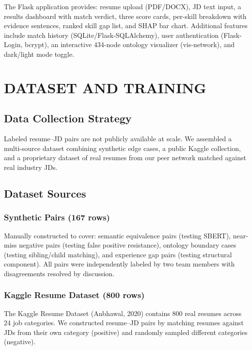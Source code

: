 \documentclass[12pt,a4paper]{report}
\begin{document}
The Flask application provides: resume upload (PDF/DOCX), JD text input, a results dashboard with match verdict, three score cards, per-skill breakdown with evidence sentences, ranked skill gap list, and SHAP bar chart. Additional features include match history (SQLite/Flask-SQLAlchemy), user authentication (Flask-Login, bcrypt), an interactive 434-node ontology visualizer (vis-network), and dark/light mode toggle.

\chapter{DATASET AND TRAINING}

\section{Data Collection Strategy}

Labeled resume--JD pairs are not publicly available at scale. We assembled a multi-source dataset combining synthetic edge cases, a public Kaggle collection, and a proprietary dataset of real resumes from our peer network matched against real industry JDs.

\section{Dataset Sources}

\subsection{Synthetic Pairs (167 rows)}

Manually constructed to cover: semantic equivalence pairs (testing SBERT), near-miss negative pairs (testing false positive resistance), ontology boundary cases (testing sibling/child matching), and experience gap pairs (testing structural component). All pairs were independently labeled by two team members with disagreements resolved by discussion.

\subsection{Kaggle Resume Dataset (800 rows)}

The Kaggle Resume Dataset (Anbhawal, 2020) contains 800 real resumes across 24 job categories. We constructed resume--JD pairs by matching resumes against JDs from their own category (positive) and randomly sampled different categories (negative).
\end{document}
